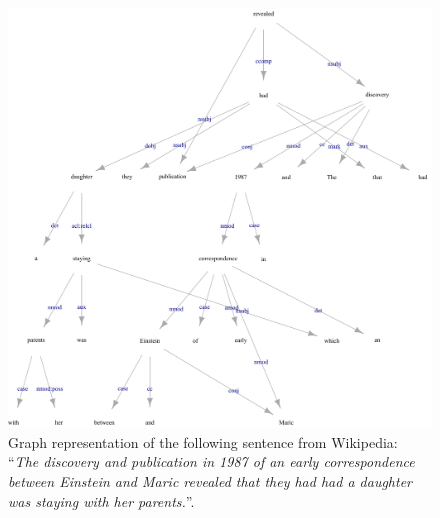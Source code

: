 \begin{figure}[!p]
	\centering
	\includegraphics[width=\textwidth]{fig/05language/00DependencyGraph}
	\caption{Graph representation of the following sentence from Wikipedia: ``\textit{The discovery and publication in 1987 of an early correspondence between Einstein and Maric revealed that they had had a daughter was staying with her parents.}''. }
	\label{fig:dependencygraph}
\end{figure} 
